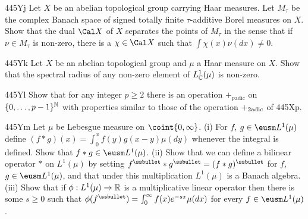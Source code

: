 {\spheader 445Yj Let $X$ be an abelian topological group carrying Haar
measures.   Let $M_{\tau}$ be the complex Banach space of signed totally
finite $\tau$-additive Borel measures on $X$.   Show that the dual
$\Cal X$ of $X$ separates the points of $M_{\tau}$ in the sense that if
$\nu\in M_{\tau}$ is non-zero, there is a $\chi\in\Cal X$ such that
$\int\chi(x)\nu(dx)\ne 0$.   

\spheader 445Yk Let $X$ be an abelian topological group and $\mu$ a Haar
measure on $X$.   Show that the spectral radius of any non-zero element
of $L_{\Bbb C}^1(\mu)$ is non-zero.   

\spheader 445Yl Show that for any integer $p\ge 2$ there is an operation
$+_{p\text{adic}}$ on $\{0,\ldots,p-1\}^{\Bbb N}$ with properties
similar to those of the operation $+_{\text{2adic}}$ of 445Xp.

\spheader 445Ym Let $\mu$ be Lebesgue measure on $\coint{0,\infty}$.
(i) For $f$, $g\in\eusm L^1(\mu)$ define
$(f*g)(x)=\int_0^xf(y)g(x-y)\mu(dy)$
whenever the integral is defined.   Show that $f*g\in\eusm L^1(\mu)$.
(ii) Show that we can define a bilinear operator $*$ on $L^1(\mu)$ by
setting $f^{\ssbullet}*g^{\ssbullet}=(f*g)^{\ssbullet}$ for $f$,
$g\in\eusm L^1(\mu)$, and that under this multiplication $L^1(\mu)$ is a
Banach algebra.   (iii) Show that if $\phi:L^1(\mu)\to\Bbb R$ is a
multiplicative linear operator then there is some $s\ge 0$ such that
$\phi(f^{\ssbullet})=\int_0^{\infty}f(x)e^{-sx}\mu(dx)$ for every
$f\in\eusm L^1(\mu)$.
}%

